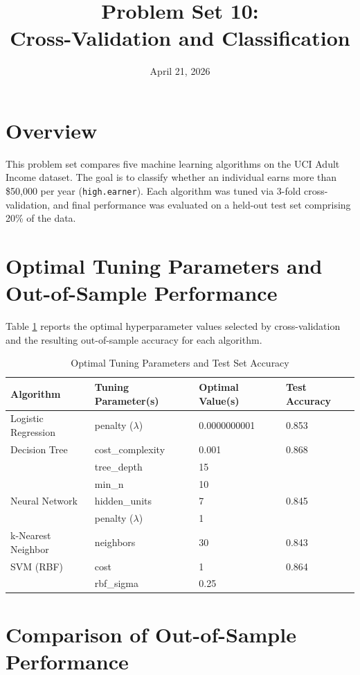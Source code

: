 \documentclass{article}
\title{\textbf{Problem Set 10:} 
\\Cross-Validation and Classification}
\author{}
\date{April 21, 2026}
\begin{document}
\maketitle

\section*{Overview}
This problem set compares five machine learning algorithms on the UCI Adult Income dataset. The goal is to classify whether an individual earns more than \$50,000 per year (\texttt{high.earner}). Each algorithm was tuned via 3-fold cross-validation, and final performance was evaluated on a held-out test set comprising 20\% of the data.

\section*{Optimal Tuning Parameters and Out-of-Sample Performance}

Table \ref{tab:results} reports the optimal hyperparameter values selected by cross-validation and the resulting out-of-sample accuracy for each algorithm.

\begin{table}[h!]
\centering
\caption{Optimal Tuning Parameters and Test Set Accuracy}
\label{tab:results}
\begin{tabular}{llll}
\toprule
Algorithm & Tuning Parameter(s) & Optimal Value(s) & Test Accuracy \\
\midrule
Logistic Regression & penalty ($\lambda$) & 0.0000000001 & 0.853 \\
Decision Tree & cost\_complexity & 0.001 & 0.868 \\
                    & tree\_depth & 15 & \\
                    & min\_n & 10 & \\
Neural Network & hidden\_units & 7 & 0.845 \\
               & penalty ($\lambda$) & 1 & \\
k-Nearest Neighbor & neighbors & 30 & 0.843 \\
SVM (RBF) & cost & 1 & 0.864 \\
          & rbf\_sigma & 0.25 & \\
\bottomrule
\end{tabular}
\end{table}

\section*{Comparison of Out-of-Sample Performance}
\end{document}

